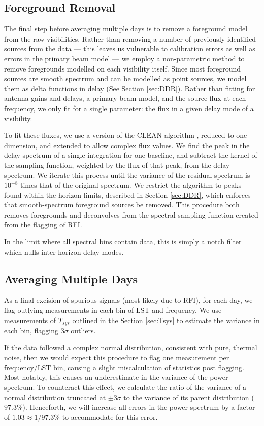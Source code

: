 \subsection{Foreground Removal}\label{sec:rm_fg}

The final step before averaging multiple days is to remove a foreground model from the raw
visibilities. Rather than removing a number of previously-identified sources from the data 
--- this leaves us vulnerable to calibration errors as well as errors in the primary beam 
model --- we employ a non-parametric method to remove foregrounds modelled on each visibility 
itself. Since most foreground sources are smooth spectrum and can be modelled as point sources, we
model them as delta functions in delay (See Section \ref{sec:DDR}). Rather than fitting for antenna 
gains and delays, a primary beam model, and the source flux at each frequency, we only fit for 
a single parameter: the flux in a given delay mode of a visibility.

To fit these fluxes, we use a version of the CLEAN algorithm \cite{Hogbom1974}, reduced to one
dimension, and extended to allow complex flux values. We find the peak in the delay
spectrum of a single integration for one baseline, and subtract the kernel of the sampling function,
weighted by the flux of that peak, from the delay spectrum. We iterate this process until the
variance of the residual spectrum is $10^{-8}$ times that of the original spectrum. We
restrict the algorithm to peaks found within the horizon limits, described in Section \ref{sec:DDR},
which enforces that smooth-spectrum foreground sources be removed. This procedure both removes
foregrounds and deconvolves from the spectral sampling function created from the flagging of RFI.

In the limit where all spectral bins contain data, this is simply a notch filter which nulls
inter-horizon delay modes.

\subsection{Averaging Multiple Days}\label{sec:LSTbin}

As a final excision of spurious signals (most likely due to RFI), for each day, we flag outlying
measurements in each bin of LST and frequency. We use measurements of $T_{sys}$ outlined in the Section
\ref{sec:Tsys} to estimate the variance in each bin, flagging $3\sigma$ outliers.

If the data followed a complex normal distribution, consistent with pure, thermal noise, then we
would expect this procedure to flag one measurement per frequency/LST bin, causing a slight
miscalculation of statistics post flagging. Most notably, this causes an underestimate in the
variance of the power spectrum. To counteract this effect, we calculate the ratio of the variance of
a normal distribution truncated at $\pm3\sigma$ to the variance of its parent distribution
($97.3\%$). Henceforth, we will increase all errors in the power spectrum by a factor of
$1.03\approx1/97.3\%$ to accommodate for this error. 

